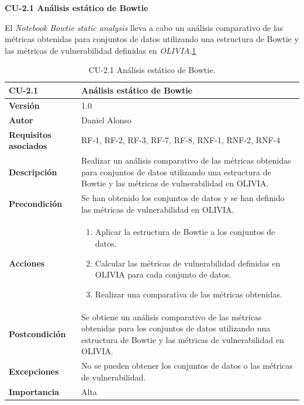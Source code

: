 \textbf{CU-2.1 Análisis estático de Bowtie}

El \textit{Notebook} \textit{Bowtie static analysis} lleva a cabo un análisis comparativo de las
métricas obtenidas para conjuntos de datos utilizando una estructura de Bowtie y
las métricas de vulnerabilidad definidas en \textit{OLIVIA}.\ref{tab:cu2.1}

\begin{table}[h!]
	\centering
	\begin{tabularx}{\linewidth}{ p{} p{} }
		\toprule
		\textbf{CU-2.1}               & \textbf{Análisis estático de Bowtie}                                          \\
		\toprule
		\textbf{Versión}              & 1.0                                                                           \\
		\textbf{Autor}                & Daniel Alonso                                                                 \\
		\textbf{Requisitos asociados} & RF-1, RF-2, RF-3, RF-7, RF-8, RNF-1, RNF-2, RNF-4                                                        \\
		\textbf{Descripción}          & Realizar un análisis comparativo de las métricas
		obtenidas para conjuntos de datos utilizando una estructura de Bowtie y las métricas
		de vulnerabilidad en OLIVIA.                                                                                  \\
		\textbf{Precondición}         & Se han obtenido los conjuntos de datos y se han definido
		las métricas de vulnerabilidad en OLIVIA.                                                                     \\
		\textbf{Acciones}             &
		\begin{enumerate}
			\def\labelenumi{\arabic{enumi}.}
			\tightlist
			\item Aplicar la estructura de Bowtie a los conjuntos de datos.
			\item Calcular las métricas de vulnerabilidad definidas en OLIVIA para cada conjunto de datos.
			\item Realizar una comparativa de las métricas obtenidas.
		\end{enumerate}                 \\
		\textbf{Postcondición}        & Se obtiene un análisis comparativo de las métricas obtenidas
		para los conjuntos de datos utilizando una estructura de Bowtie y las métricas de
		vulnerabilidad en OLIVIA.                                                                                     \\
		\textbf{Excepciones}          & No se pueden obtener los conjuntos de datos o las métricas de vulnerabilidad. \\
		\textbf{Importancia}          & Alta                                                                          \\
		\bottomrule
	\end{tabularx}
	\caption{CU-2.1 Análisis estático de Bowtie.}
	\label{tab:cu2.1}
\end{table}

